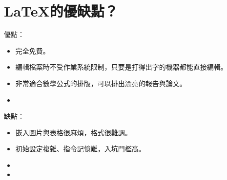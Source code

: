 \documentclass[12pt, a4paper, oneside]{extbook}
\let\tmpLaTeX\LaTeX
\renewcommand{\LaTeX}{\textrm{\tmpLaTeX}}
\begin{document}
	\section{\LaTeX 的優缺點？}
		優點：
		\begin{itemize}
			\item 完全免費。
			\item 編輯檔案時不受作業系統限制，只要是打得出字的機器都能直接編輯。
			\item 非常適合數學公式的排版，可以排出漂亮的報告與論文。
			\item 
		\end{itemize}
		
		缺點：
		\begin{itemize}
			\item 嵌入圖片與表格很麻煩，格式很難調。
			\item 初始設定複雜、指令記憶難，入坑門檻高。
			\item 
			\item 
		\end{itemize}
\end{document}
